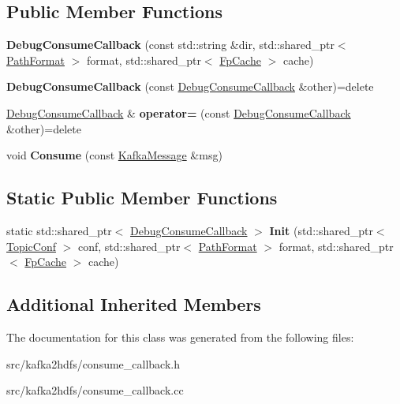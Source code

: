 \subsection*{Public Member Functions}
\begin{DoxyCompactItemize}
\item 
{\bfseries Debug\+Consume\+Callback} (const std\+::string \&dir, std\+::shared\+\_\+ptr$<$ \hyperlink{classlog2hdfs_1_1PathFormat}{Path\+Format} $>$ format, std\+::shared\+\_\+ptr$<$ \hyperlink{classlog2hdfs_1_1FpCache}{Fp\+Cache} $>$ cache)\hypertarget{classlog2hdfs_1_1DebugConsumeCallback_a93c8681a3be7473c6ddb33e5366a47b5}{}\label{classlog2hdfs_1_1DebugConsumeCallback_a93c8681a3be7473c6ddb33e5366a47b5}

\item 
{\bfseries Debug\+Consume\+Callback} (const \hyperlink{classlog2hdfs_1_1DebugConsumeCallback}{Debug\+Consume\+Callback} \&other)=delete\hypertarget{classlog2hdfs_1_1DebugConsumeCallback_a907cb23b80e3f5e4cf5a0b903d988e18}{}\label{classlog2hdfs_1_1DebugConsumeCallback_a907cb23b80e3f5e4cf5a0b903d988e18}

\item 
\hyperlink{classlog2hdfs_1_1DebugConsumeCallback}{Debug\+Consume\+Callback} \& {\bfseries operator=} (const \hyperlink{classlog2hdfs_1_1DebugConsumeCallback}{Debug\+Consume\+Callback} \&other)=delete\hypertarget{classlog2hdfs_1_1DebugConsumeCallback_a5222e63ba01c7ebd0b1ff8956d3ab733}{}\label{classlog2hdfs_1_1DebugConsumeCallback_a5222e63ba01c7ebd0b1ff8956d3ab733}

\item 
void {\bfseries Consume} (const \hyperlink{classlog2hdfs_1_1KafkaMessage}{Kafka\+Message} \&msg)\hypertarget{classlog2hdfs_1_1DebugConsumeCallback_aa43ed75073234c2a9d2a1327a2582be7}{}\label{classlog2hdfs_1_1DebugConsumeCallback_aa43ed75073234c2a9d2a1327a2582be7}

\end{DoxyCompactItemize}
\subsection*{Static Public Member Functions}
\begin{DoxyCompactItemize}
\item 
static std\+::shared\+\_\+ptr$<$ \hyperlink{classlog2hdfs_1_1DebugConsumeCallback}{Debug\+Consume\+Callback} $>$ {\bfseries Init} (std\+::shared\+\_\+ptr$<$ \hyperlink{classlog2hdfs_1_1TopicConf}{Topic\+Conf} $>$ conf, std\+::shared\+\_\+ptr$<$ \hyperlink{classlog2hdfs_1_1PathFormat}{Path\+Format} $>$ format, std\+::shared\+\_\+ptr$<$ \hyperlink{classlog2hdfs_1_1FpCache}{Fp\+Cache} $>$ cache)\hypertarget{classlog2hdfs_1_1DebugConsumeCallback_a0002dd402cdf057e28c1189c4c4788fb}{}\label{classlog2hdfs_1_1DebugConsumeCallback_a0002dd402cdf057e28c1189c4c4788fb}

\end{DoxyCompactItemize}
\subsection*{Additional Inherited Members}


The documentation for this class was generated from the following files\+:\begin{DoxyCompactItemize}
\item 
src/kafka2hdfs/consume\+\_\+callback.\+h\item 
src/kafka2hdfs/consume\+\_\+callback.\+cc\end{DoxyCompactItemize}
